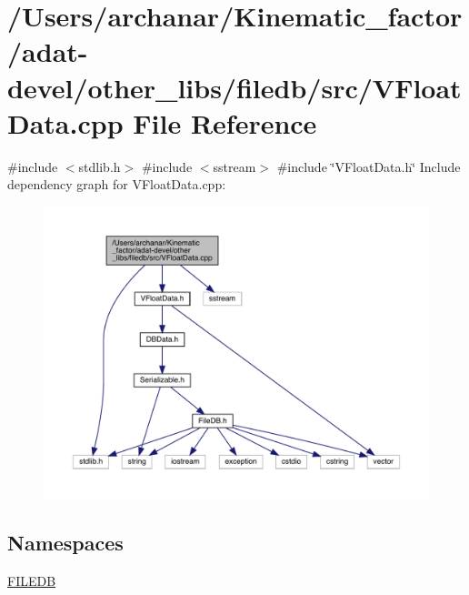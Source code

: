 \hypertarget{adat-devel_2other__libs_2filedb_2src_2VFloatData_8cpp}{}\section{/\+Users/archanar/\+Kinematic\+\_\+factor/adat-\/devel/other\+\_\+libs/filedb/src/\+V\+Float\+Data.cpp File Reference}
\label{adat-devel_2other__libs_2filedb_2src_2VFloatData_8cpp}
{\ttfamily \#include $<$stdlib.\+h$>$}\newline
{\ttfamily \#include $<$sstream$>$}\newline
{\ttfamily \#include \char`\"{}V\+Float\+Data.\+h\char`\"{}}\newline
Include dependency graph for V\+Float\+Data.\+cpp\+:
\nopagebreak
\begin{figure}[H]
\begin{center}
\leavevmode
\includegraphics[width=350pt]{dc/d77/adat-devel_2other__libs_2filedb_2src_2VFloatData_8cpp__incl}
\end{center}
\end{figure}
\subsection*{Namespaces}
\begin{DoxyCompactItemize}
\item 
 \mbox{\hyperlink{namespaceFILEDB}{F\+I\+L\+E\+DB}}
\end{DoxyCompactItemize}
